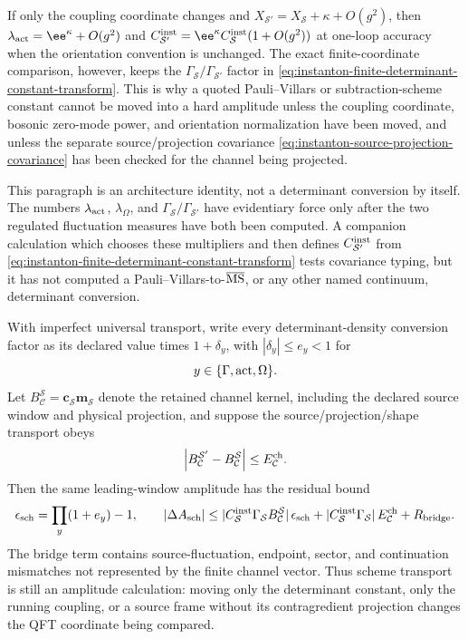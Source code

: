 \begin{remark}
If only the coupling coordinate changes and
\(X_{{\mathcal S}'}=X_{\mathcal S}+\kappa+O(g^2)\), then
\(\lambda_{\rm act}=\ee^\kappa+O(g^2)\) and
\(C_{{\mathcal S}'}^{\rm inst}=\ee^\kappa C_{\mathcal S}^{\rm inst}(1+O(g^2))\)
at one-loop accuracy when the orientation convention is unchanged.  The exact
finite-coordinate comparison, however, keeps the
\(\Gamma_{\mathcal S}/\Gamma_{{\mathcal S}'}\) factor in
\eqref{eq:instanton-finite-determinant-constant-transform}.  This is why a
quoted Pauli--Villars or subtraction-scheme constant cannot be moved into a
hard amplitude unless the coupling coordinate, bosonic zero-mode power, and
orientation normalization have been moved, and unless the separate
source/projection covariance \eqref{eq:instanton-source-projection-covariance}
has been checked for the channel being projected.

This paragraph is an architecture identity, not a determinant conversion by
itself.  The numbers \(\lambda_{\rm act}\), \(\lambda_\Omega\), and
\(\Gamma_{\mathcal S}/\Gamma_{{\mathcal S}'}\) have evidentiary force only
after the two regulated fluctuation measures have both been computed.  A
companion calculation which chooses these multipliers and then defines
\(C_{{\mathcal S}'}^{\rm inst}\) from
\eqref{eq:instanton-finite-determinant-constant-transform} tests covariance
typing, but it has not computed a Pauli--Villars-to-\(\overline{\rm MS}\), or
any other named continuum, determinant conversion.

With imperfect universal transport, write every determinant-density conversion
factor as its declared value times \(1+\delta_y\), with
\(|\delta_y|\le e_y<1\) for
\[
  y\in\{\Gamma,{\rm act},\Omega\}.
\]
Let \(B_{\mathcal C}^{\mathcal S}=\mathbf c_{\mathcal S}\mathbf m_{\mathcal S}\)
denote the retained channel kernel, including the declared source window and
physical projection, and suppose the source/projection/shape transport obeys
\[
  \left|
  B_{\mathcal C}^{{\mathcal S}'}-B_{\mathcal C}^{\mathcal S}
  \right|
  \le E_{\mathcal C}^{\rm ch}.
\]
Then the same leading-window amplitude has the residual bound
\begin{equation}
  \begin{aligned}
  \epsilon_{\rm sch}
  =
  \prod_y(1+e_y)-1,
  \qquad
  |\Delta A_{\rm sch}|
  \le
  |C_{\mathcal S}^{\rm inst}\Gamma_{\mathcal S}
  B_{\mathcal C}^{\mathcal S}|\,
  \epsilon_{\rm sch}
  +
  |C_{\mathcal S}^{\rm inst}\Gamma_{\mathcal S}|\,
  E_{\mathcal C}^{\rm ch}
  +R_{\rm bridge}.
  \end{aligned}
  \label{eq:instanton-finite-determinant-scheme-residual}
\end{equation}
The bridge term contains source-fluctuation, endpoint, sector, and continuation
mismatches not represented by the finite channel vector.  Thus scheme transport
is still an amplitude calculation: moving only the determinant constant, only
the running coupling, or a source frame without its contragredient projection
changes the QFT coordinate being compared.
\end{remark}


